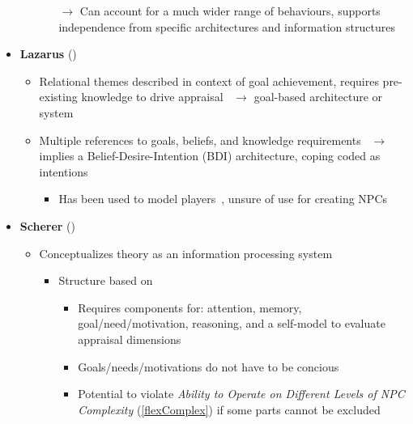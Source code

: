 \begin{itemize}
\begin{itemize}
\begin{itemize}
            \item [$\rightarrow$] Can account for a much wider range of
            behaviours, supports independence from specific architectures and
            information structures
        \end{itemize}
    \end{itemize}

    \item \textbf{Lazarus} (\good)
    \begin{itemize}
        \item Relational themes described in context of goal achievement,
        requires pre-existing knowledge to drive appraisal~\citep[p.~81,
        145]{lazarus1991emotion} $\rightarrow$ goal-based architecture or system

        \item Multiple references to goals, beliefs, and knowledge
        requirements~\citep[p.~39, 151, 177, 210]{lazarus1991emotion}
        $\rightarrow$ implies a Belief-Desire-Intention (BDI) architecture,
        coping coded as intentions
        \begin{itemize}
            \item Has been used to model
            players~\citep[p.~208--209]{yannakakis2018artificial}, unsure of
            use for creating NPCs
        \end{itemize}
    \end{itemize}

    \item \textbf{Scherer} (\disqualified)
    \begin{itemize}
        \item Conceptualizes theory as an information processing
        system~\citep[p.~103--104]{scherer2001appraisalB}
        \begin{itemize}
            \item Structure based on \citet{cowan1988evolving}
            \begin{itemize}
                \item Requires components for: attention, memory,
                goal/need/motivation, reasoning, and a self-model to evaluate
                appraisal dimensions~\citep[p.~100]{scherer2001appraisalB}

                \item Goals/needs/motivations do not have to be
                concious~\citep[p.~96, 119]{scherer2001appraisalB}

                \item Potential to violate \textit{Ability to Operate on
                    Different Levels of NPC Complexity} (\ref{flexComplex}) if
                    some
                parts cannot be excluded
            \end{itemize}


\end{itemize}
\end{itemize}
\end{itemize}
